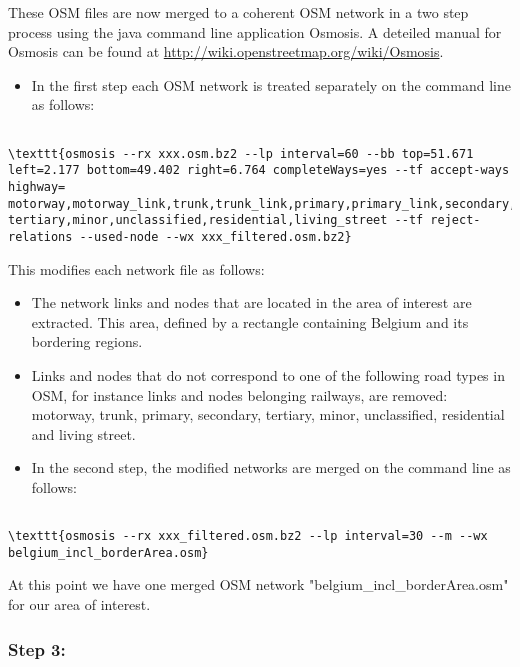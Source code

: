 These OSM files are now merged to a coherent OSM network in a two  step process using the java command line application Osmosis. A deteiled  manual for Osmosis can be found at \href{http://wiki.openstreetmap.org/wiki/Osmosis}{http://wiki.openstreetmap.org/wiki/Osmosis}.
\begin{itemize}
	\item In the first step each OSM network is treated separately on the command line as follows:
\end{itemize}
\begin{verbatim}

\texttt{osmosis --rx xxx.osm.bz2 --lp interval=60 --bb top=51.671 left=2.177 bottom=49.402 right=6.764 completeWays=yes --tf accept-ways highway= motorway,motorway_link,trunk,trunk_link,primary,primary_link,secondary, tertiary,minor,unclassified,residential,living_street --tf reject-relations --used-node --wx xxx_filtered.osm.bz2}
\end{verbatim}

This modifies each network file as follows:
\begin{itemize}
	\item The network links and nodes that are  located in the area of interest are extracted. This area, defined by a  rectangle containing Belgium and its bordering regions.
	\item Links and nodes that do not correspond  to one of the following road types in OSM, for instance links and nodes  belonging railways, are removed: motorway, trunk, primary, secondary,  tertiary, minor, unclassified, residential and living street.
\end{itemize}
\begin{itemize}
	\item In the second step, the modified networks are merged on the command line as follows:
\end{itemize}
\begin{verbatim}

\texttt{osmosis --rx xxx_filtered.osm.bz2 --lp interval=30 --m --wx belgium_incl_borderArea.osm}
\end{verbatim}

At this point we have one merged OSM network "belgium\_incl\_borderArea.osm" for our area of interest.

\subsubsection{Step 3:}

